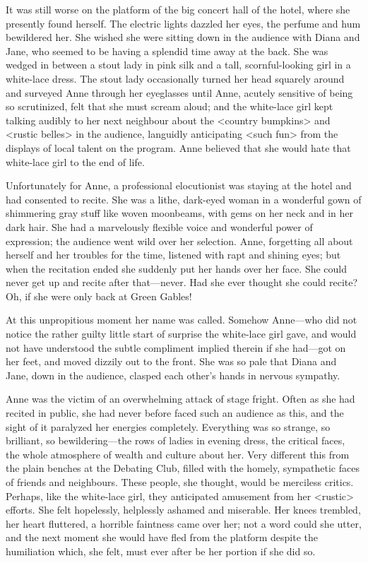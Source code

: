 It was still worse on the platform of the big concert hall of the hotel, where she presently found herself. The electric lights dazzled her eyes, the perfume and hum bewildered her. She wished she were sitting down in the audience with Diana and Jane, who seemed to be having a splendid time away at the back. She was wedged in between a stout lady in pink silk and a tall, scornful-looking girl in a white-lace dress. The stout lady occasionally turned her head squarely around and surveyed Anne through her eyeglasses until Anne, acutely sensitive of being so scrutinized, felt that she must scream aloud; and the white-lace girl kept talking audibly to her next neighbour about the <country bumpkins> and <rustic belles> in the audience, languidly anticipating <such fun> from the displays of local talent on the program. Anne believed that she would hate that white-lace girl to the end of life.

Unfortunately for Anne, a professional elocutionist was staying at the hotel and had consented to recite. She was a lithe, dark-eyed woman in a wonderful gown of shimmering gray stuff like woven moonbeams, with gems on her neck and in her dark hair. She had a marvelously flexible voice and wonderful power of expression; the audience went wild over her selection. Anne, forgetting all about herself and her troubles for the time, listened with rapt and shining eyes; but when the recitation ended she suddenly put her hands over her face. She could never get up and recite after that—never. Had she ever thought she could recite? Oh, if she were only back at Green Gables!

At this unpropitious moment her name was called. Somehow Anne—who did not notice the rather guilty little start of surprise the white-lace girl gave, and would not have understood the subtle compliment implied therein if she had—got on her feet, and moved dizzily out to the front. She was so pale that Diana and Jane, down in the audience, clasped each other's hands in nervous sympathy.

Anne was the victim of an overwhelming attack of stage fright. Often as she had recited in public, she had never before faced such an audience as this, and the sight of it paralyzed her energies completely. Everything was so strange, so brilliant, so bewildering—the rows of ladies in evening dress, the critical faces, the whole atmosphere of wealth and culture about her. Very different this from the plain benches at the Debating Club, filled with the homely, sympathetic faces of friends and neighbours. These people, she thought, would be merciless critics. Perhaps, like the white-lace girl, they anticipated amusement from her <rustic> efforts. She felt hopelessly, helplessly ashamed and miserable. Her knees trembled, her heart fluttered, a horrible faintness came over her; not a word could she utter, and the next moment she would have fled from the platform despite the humiliation which, she felt, must ever after be her portion if she did so.

